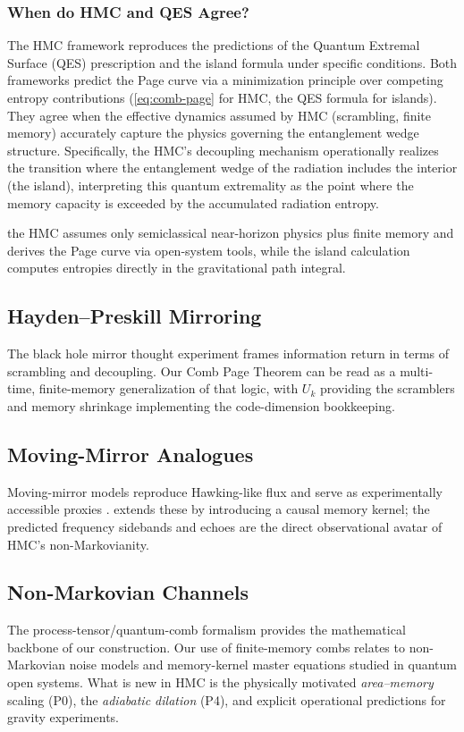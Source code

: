 \documentclass[aps,prd,preprint,onecolumn,superscriptaddress,nofootinbib,longbibliography,floatfix,11pt,showpacs,showkeys]{revtex4-2}
\newcommand{\HMC}{\textsc{HMC}\xspace}
\theoremstyle{plain}
\theoremstyle{definition}
\theoremstyle{remark}
\begin{document}
\subsubsection{When do HMC and QES Agree?}
The \HMC{} framework reproduces the predictions of the Quantum Extremal Surface (QES) prescription and the island formula under specific conditions. Both frameworks predict the Page curve via a minimization principle over competing entropy contributions (\eqref{eq:comb-page} for \HMC{}, the QES formula for islands). They agree when the effective dynamics assumed by \HMC{} (scrambling, finite memory) accurately capture the physics governing the entanglement wedge structure. Specifically, the \HMC{}'s decoupling mechanism operationally realizes the transition where the entanglement wedge of the radiation includes the interior (the island), interpreting this quantum extremality as the point where the memory capacity is exceeded by the accumulated radiation entropy.


the \HMC{} assumes only semiclassical near-horizon physics plus finite memory and derives the Page curve via open-system tools,
while the island calculation computes entropies directly in the gravitational path integral.

\subsection{Hayden--Preskill Mirroring}
The black hole mirror thought experiment \cite{Hayden:2007} frames information return in terms of scrambling and decoupling.
Our Comb Page Theorem can be read as a multi-time, finite-memory generalization of that logic, with $U_k$ providing the scramblers
and memory shrinkage implementing the code-dimension bookkeeping.

\subsection{Moving-Mirror Analogues}
Moving-mirror models reproduce Hawking-like flux and serve as experimentally accessible proxies \cite{Davies:1976,GoodLinder:2017}.
 extends these by introducing a causal memory kernel; the predicted frequency sidebands and echoes
are the direct observational avatar of \HMC{}'s non-Markovianity.

\subsection{Non-Markovian Channels}
The process-tensor/quantum-comb formalism \cite{Chiribella:2009} provides the mathematical backbone of our construction.
Our use of finite-memory combs relates to non-Markovian noise models and memory-kernel master equations studied in quantum open systems.
What is new in \HMC{} is the physically motivated \emph{area--memory} scaling (P0), the \emph{adiabatic dilation} (P4), and explicit operational predictions for gravity experiments.
\end{document}
